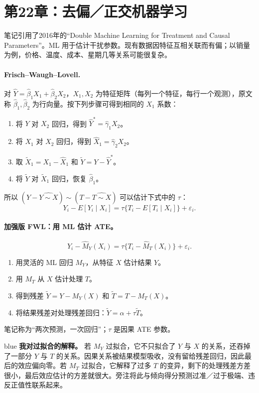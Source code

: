 {\section{第22章：去偏／正交机器学习}
笔记引用了2016年的“Double Machine Learning for Treatment and Causal Parameters”。ML 用于估计干扰参数。现有数据因特征互相关联而有偏；以销量为例，价格、温度、成本、星期几等关系可能很复杂。

\paragraph{Frisch--Waugh--Lovell.}
对 $\hat Y=\hat\beta_1X_1+\hat\beta_2X_2$，$X_1,X_2$ 为特征矩阵（每列一个特征，每行一个观测），原文称 $\hat\beta_1,\hat\beta_2$ 为行向量。按下列步骤可得到相同的 $X_1$ 系数：
\begin{enumerate}
\item 将 $Y$ 对 $X_2$ 回归，得到 $\hat Y^*=\hat\gamma_1X_2$。
\item 将 $X_1$ 对 $X_2$ 回归，得到 $\hat X_1=\hat\gamma_2X_2$。
\item 取 $\widetilde X_1=X_1-\hat X_1$ 和 $\widetilde Y=Y-\hat Y^*$。
\item 将 $\widetilde Y$ 对 $\widetilde X_1$ 回归，恢复 $\hat\beta_1$。
\end{enumerate}
所以 $(Y-\widehat{Y\sim X})\sim(T-\widehat{T\sim X})$ 可以估计下式中的 $\tau$：
\[Y_i-E[Y_i\mid X_i]=\tau\{T_i-E[T_i\mid X_i]\}+\varepsilon_i.\]

\paragraph{加强版 FWL：用 ML 估计 ATE。}
\[Y_i-\hat M_Y(X_i)=\tau\{T_i-\hat M_T(X_i)\}+\varepsilon_i.\]
\begin{enumerate}
\item 用灵活的 ML 回归 $M_Y$，从特征 $X$ 估计结果 $Y$。
\item 用 $M_T$ 从 $X$ 估计处理 $T$。
\item 得到残差 $\widetilde Y=Y-M_Y(X)$ 和 $\widetilde T=T-M_T(X)$。
\item 将结果残差对处理残差回归：$\widetilde Y=\alpha+\tau\widetilde T$。
\end{enumerate}
笔记称为“两次预测，一次回归”；$\tau$ 是因果 ATE 参数。

\begin{inkblock}{blue}
\textbf{我对过拟合的解释。} 若 $M_Y$ 过拟合，它不只拟合了 $Y$ 与 $X$ 的关系，还吞掉了一部分 $Y$ 与 $T$ 的关系。因果关系被结果模型吸收，没有留给残差回归，因此最后的效应偏向零。若 $M_T$ 过拟合，它解释了过多 $T$ 的变异，剩下的处理残差方差很小，最后效应估计的方差就很大。旁注将此与倾向得分预测过准／过于极端、违反正值性联系起来。
\end{inkblock}

}
